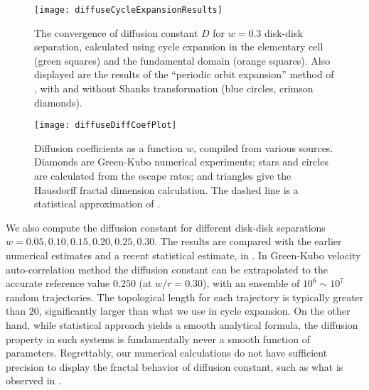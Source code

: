 \begin{figure}
	\texttt{[image: diffuseCycleExpansionResults]}
	\caption{\label{fig-convergence}
The convergence of diffusion constant $D$  for  $w=0.3$
disk-disk separation, calculated using cycle expansion in the elementary cell
(green squares) and the fundamental domain (orange squares). Also displayed are
the results of the ``periodic orbit expansion'' method of , with and
without Shanks transformation (blue circles, crimson diamonds).
		}
\end{figure}

\begin{figure}
	\texttt{[image: diffuseDiffCoefPlot]}
	\caption[Diffusion coefficients computed using cycle expansion formulas]
    {\label{fig-results}
Diffusion coefficients as a function $w$, compiled from various sources.
Diamonds are Green-Kubo numerical experiments;
stars and circles are calculated from the escape
rates; and triangles give the Hausdorff fractal dimension
calculation. The dashed line  is a statistical approximation
of .
    }
\end{figure}

We also compute the diffusion constant for different disk-disk separations
$w = 0.05, 0.10, 0.15, 0.20, 0.25, 0.30$.
The results are compared with the earlier numerical estimates and a recent
statistical estimate, in .
In Green-Kubo velocity auto-correlation method the  diffusion constant can be
extrapolated to the accurate reference value $0.250$ (at $w/r=0.30$), with an
ensemble of $10^6\sim10^7$ random trajectories.
The topological length for each trajectory is typically greater than $20$,
significantly larger than what we use in cycle expansion.
On the other hand, while statistical approach yields a smooth analytical
formula, the diffusion property in such systems is fundamentally
never a smooth function of parameters.
Regrettably, our numerical calculations do not have sufficient precision to
display the fractal behavior of diffusion constant, such as what is  observed in
.

